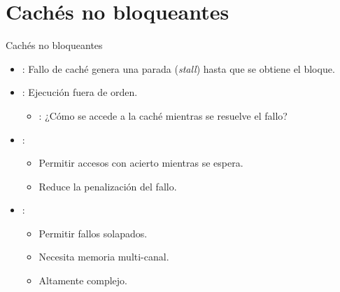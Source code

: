\section{Cachés no bloqueantes}

\begin{frame}[t]{Cachés no bloqueantes}
\begin{itemize}
  \item {}: 
        Fallo de caché genera una parada (\emph{stall}) hasta que se obtiene el bloque.

  \item {}: Ejecución fuera de orden.
    \begin{itemize}
      \item {}: 
            ¿Cómo se accede a la caché mientras se resuelve el fallo?
    \end{itemize}

  \item {}:
    \begin{itemize}
      \item Permitir accesos con acierto mientras se espera.
      \item Reduce la penalización del fallo.
    \end{itemize}

  \item {}:
    \begin{itemize}
      \item Permitir fallos solapados.
      \item Necesita memoria multi-canal.
      \item Altamente complejo.
    \end{itemize}
\end{itemize}
\end{frame}
